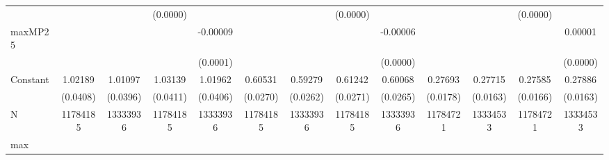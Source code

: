 {\begin{tabular}{l*{12}{c}}
            &                     &                     &    (0.0000)         &                     &                     &                     &    (0.0000)         &                     &                     &                     &    (0.0000)         &                     \\
maxMP25     &                     &                     &                     &    -0.00009\sym{*}  &                     &                     &                     &    -0.00006         &                     &                     &                     &     0.00001         \\
            &                     &                     &                     &    (0.0001)         &                     &                     &                     &    (0.0000)         &                     &                     &                     &    (0.0000)         \\
Constant    &     1.02189\sym{***}&     1.01097\sym{***}&     1.03139\sym{***}&     1.01962\sym{***}&     0.60531\sym{***}&     0.59279\sym{***}&     0.61242\sym{***}&     0.60068\sym{***}&     0.27693\sym{***}&     0.27715\sym{***}&     0.27585\sym{***}&     0.27886\sym{***}\\
            &    (0.0408)         &    (0.0396)         &    (0.0411)         &    (0.0406)         &    (0.0270)         &    (0.0262)         &    (0.0271)         &    (0.0265)         &    (0.0178)         &    (0.0163)         &    (0.0166)         &    (0.0163)         \\
\midrule
N           &    11784185         &    13333936         &    11784185         &    13333936         &    11784185         &    13333936         &    11784185         &    13333936         &    11784721         &    13334533         &    11784721         &    13334533         \\
max         &                     &                     &                     &                     &                     &                     &                     &                     &                     &                     &                     &                     \\
\bottomrule
\end{tabular}
}
